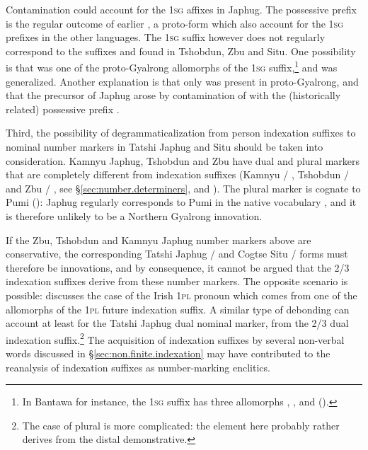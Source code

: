Contamination could account  for the \textsc{1sg} affixes in Japhug.  The possessive prefix  is the regular outcome of earlier , a proto-form which also account for the \textsc{1sg} prefixes in the other languages. The \textsc{1sg} suffix  however does not regularly correspond to the suffixes  and  found in Tshobdun, Zbu and Situ. One possibility is that  was one of the proto-Gyalrong allomorphs of the \textsc{1sg} suffix,\footnote{In Bantawa for instance, the \textsc{1sg} suffix has three allomorphs , , and  (\citealt[155]{doornenbal09}). } and was generalized. Another explanation is that only  was present in proto-Gyalrong, and that the   precursor of Japhug  arose by contamination of  with the (historically related) possessive prefix . 


Third, the possibility of degrammaticalization from person indexation suffixes to nominal number markers in Tatshi Japhug and Situ should be taken into consideration. Kamnyu Japhug, Tshobdun and Zbu have dual and plural markers that are completely different from indexation suffixes (Kamnyu  / , Tshobdun  / and Zbu  / , see §\ref{sec:number.determiners}, \citealt{jackson98morphology} and \citealt{gong18these}). The plural marker is cognate to Pumi  (\citealt[135]{daudey14grammar}): Japhug  regularly corresponds to Pumi  in the native vocabulary \citep{jacques17num}, and it is therefore unlikely to be a Northern Gyalrong innovation. 

If the Zbu, Tshobdun and Kamnyu Japhug number markers above are conservative,  the corresponding Tatshi Japhug  /  and Cogtse Situ  /  forms must therefore be innovations, and by consequence, it cannot be argued that the 2/3 indexation suffixes derive from these number markers. The opposite scenario is possible: \citet[204--206]{norde09degrammaticalization} discusses the case of the Irish \textsc{1pl} pronoun  which comes from one of the allomorphs of the  \textsc{1pl} future indexation suffix. A similar type of debonding can account at least for the Tatshi Japhug dual  nominal marker, from the 2/3 dual  indexation suffix.\footnote{The case of plural  is more complicated: the   element here probably rather derives from the distal demonstrative. } The acquisition of indexation suffixes by several non-verbal words discussed in §\ref{sec:non.finite.indexation} may have contributed to the reanalysis of indexation suffixes as number-marking enclitics.

